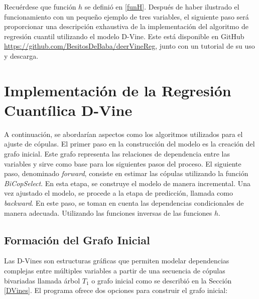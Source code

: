 Recuérdese que función $h$ se definió en \eqref{funH}. Después de haber ilustrado el funcionamiento con un pequeño ejemplo de tres variables, el siguiente paso será proporcionar una descripción exhaustiva de la implementación del algoritmo de regresión cuantil utilizando el modelo D-Vine. Este está disponible en GitHub \url{https://github.com/BesitosDeBaba/deerVineReg}, junto con un tutorial de su uso y descarga.

\section{Implementación de la Regresión Cuantílica D-Vine}

A continuación, se abordarían aspectos como los algoritmos utilizados para el ajuste de cópulas. El primer paso en la construcción del modelo es la creación del grafo inicial. Este grafo representa las relaciones de dependencia entre las variables y sirve como base para los siguientes pasos del proceso. El siguiente paso, denominado \textit{forward}, consiste en estimar las cópulas utilizando la función \textit{BiCopSelect}. En esta etapa, se construye el modelo de manera incremental. Una vez ajustado el modelo, se procede a la etapa de predicción, llamada como \textit{backward}. En este paso, se toman en cuenta las dependencias condicionales de manera adecuada. Utilizando las funciones inversas de las funciones $h$.

\subsection{Formación del Grafo Inicial}

Las D-Vines son estructuras gráficas que permiten modelar dependencias complejas entre múltiples variables a partir de una secuencia de cópulas bivariadas llamada árbol $T_1$ o grafo inicial como se describió en la Sección \ref{DVines}. El programa ofrece dos opciones para construir el grafo inicial:

